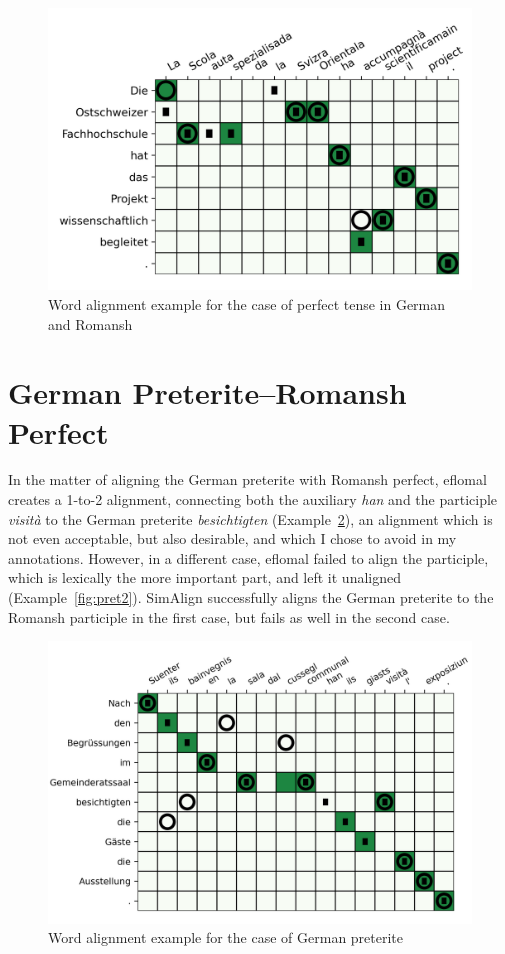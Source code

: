 \begin{figure}[ht]
\includegraphics{graphics/alignments/example7-prefect2.png}
\caption{Word alignment example for the case of perfect tense in German and Romansh}\label{fig:alignment-perfect2}
\end{figure}



\section{German Preterite--Romansh Perfect}

In the matter of aligning the German preterite with Romansh perfect, eflomal creates a 1-to-2 alignment, connecting both the auxiliary \emph{han} and the participle \emph{visità} to the German preterite \emph{besichtigten} (Example~\ref{fig:pret1}), an alignment which is not even acceptable, but also desirable, and which I chose to avoid in my annotations. However, in a different case, eflomal failed to align the participle, which is lexically the more important part, and left it unaligned (Example~\ref{fig:pret2}). 
SimAlign successfully aligns the German preterite to the Romansh participle in the first case, but fails as well in the second case.


\begin{figure}[ht]
\includegraphics{graphics/alignments/example3.png}
\caption{Word alignment example for the case of German preterite}\label{fig:pret1}
\end{figure}

